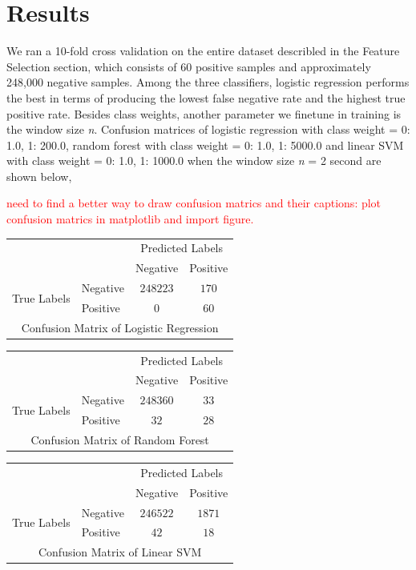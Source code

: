\documentclass{soups}
\begin{document}
\section{Results}
We ran a 10-fold cross validation on the entire dataset describled in the Feature Selection section, which consists of 60 positive samples and approximately 248,000 negative samples. Among the three classifiers, logistic regression performs the best in terms of producing the lowest false negative rate and the highest true positive rate. Besides class weights, another parameter we finetune in training is the window size \textit{n}. Confusion matrices of logistic regression with class weight = {0: 1.0, 1: 200.0}, random forest with class weight = {0: 1.0, 1: 5000.0} and linear SVM with class weight = {0: 1.0, 1: 1000.0} when the window size \textit{n} = 2 second are shown below,

\textcolor{red}{need to find a better way to draw confusion matrics and their captions: plot confusion matrics in matplotlib and import figure.}

\begin{tabular}{l|l|c|c|}
\multicolumn{2}{c}{} &\multicolumn{2}{c}{Predicted Labels}\\
\cline{3-4}
\multicolumn{2}{c|}{}&Negative&Positive \\
\cline{2-4}
\multirow{2}{*}{True Labels}& Negative  & $248223$ & $170$ \\
\cline{2-4}
& Positive & $0$ & $60$ \\
\cline{2-4}
\multicolumn{4}{c}{Confusion Matrix of Logistic Regression} 
\end{tabular}

\begin{tabular}{l|l|c|c|}
\multicolumn{2}{c}{} &\multicolumn{2}{c}{Predicted Labels}\\
\cline{3-4}
\multicolumn{2}{c|}{}&Negative&Positive \\
\cline{2-4}
\multirow{2}{*}{True Labels}& Negative  & $248360$ & $33$ \\
\cline{2-4}
& Positive & $32$ & $28$ \\
\cline{2-4}
\multicolumn{4}{c}{Confusion Matrix of Random Forest} 
\end{tabular}

\begin{tabular}{l|l|c|c|}
\multicolumn{2}{c}{} &\multicolumn{2}{c}{Predicted Labels}\\
\cline{3-4}
\multicolumn{2}{c|}{}&Negative&Positive \\
\cline{2-4}
\multirow{2}{*}{True Labels}& Negative  & $246522$ & $1871$ \\
\cline{2-4}
& Positive & $42$ & $18$ \\
\cline{2-4}
\multicolumn{4}{c}{Confusion Matrix of Linear SVM} 
\end{tabular}
\end{document}

